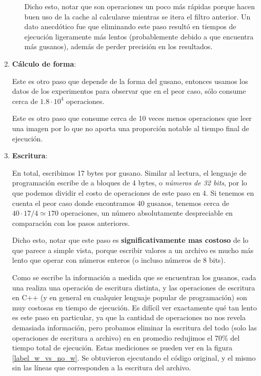 \documentclass{article}
\begin{document}
\begin{enumerate}[topsep=0pt]
\begin{enumerate}
\hspace{0.2cm} Dicho esto, notar que son operaciones un poco más rápidas porque hacen buen uso de la cache al calcularse mientras se itera el filtro anterior. Un dato anecdótico fue que eliminando este paso resultó en tiempos de ejecución ligeramente más lentos (probablemente debido a que encuentra más gusanos), además de perder precisión en los resultados.
\end{enumerate}

\item \textbf{Cálculo de forma}:

\hspace{0.2cm} Este es otro paso que depende de la forma del gusano, entonces usamos los datos de los experimentos para observar que en el peor caso, sólo consume cerca de $1.8 \cdot 10^4$ operaciones.

\hspace{0.2cm} Este es otro paso que consume cerca de 10 veces menos operaciones que leer una imagen por lo que no aporta una proporción notable al tiempo final de ejecución.

\item \textbf{Escritura}:

\hspace{0.2cm} En total, escribimos 17 bytes por gusano. Similar al lectura, el lenguaje de programación escribe de a bloques de 4 bytes, o \emph{números de 32 bits}, por lo que podemos dividir el costo de operaciones de este paso en 4. Si tenemos en cuenta el peor caso donde encontramos 40 gusanos, tenemos cerca de $40\cdot17/4 \simeq 170$ operaciones, un número absolutamente despreciable en comparación con los pasos anteriores.

\hspace{0.2cm} Dicho esto, notar que este paso es \textbf{significativamente mas costoso} de lo que parece a simple vista, porque escribir valores a un archivo es mucho más lento que operar con números enteros (o incluso números de 8 bits).

\hspace{0.2cm} Como se escribe la información a medida que se encuentran los gusanos, cada una realiza una operación de escritura distinta, y las operaciones de escritura en C++ (y en general en cualquier lenguaje popular de programación) son muy costosas en tiempo de ejecución. Es difícil ver exactamente qué tan lento es este paso en particular, ya que la cantidad de operaciones no nos revela demasiada información, pero probamos eliminar la escritura del todo (solo las operaciones de escritura a archivo) en en promedio redujimos el 70\% del tiempo total de ejecución. Estas mediciones se pueden ver en la figura \ref{label_w_vs_no_w}. Se obtuvieron ejecutando el código original, y el mismo sin las líneas que corresponden a la escritura del archivo.


\end{enumerate}
\end{document}
